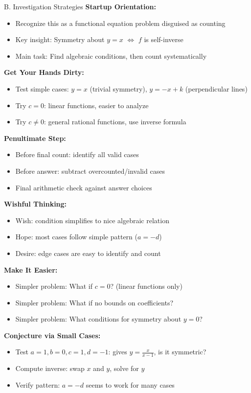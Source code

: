 \documentclass[12pt]{article}
\begin{document}
\begin{strategybox}{B. Investigation Strategies}
\textbf{Startup Orientation:}
\begin{itemize}
    \item Recognize this as a functional equation problem disguised as counting
    \item Key insight: Symmetry about $y=x$ $\Leftrightarrow$ $f$ is self-inverse
    \item Main task: Find algebraic conditions, then count systematically
\end{itemize}

\textbf{Get Your Hands Dirty:}
\begin{itemize}
    \item Test simple cases: $y=x$ (trivial symmetry), $y=-x+k$ (perpendicular lines)
    \item Try $c=0$: linear functions, easier to analyze
    \item Try $c \neq 0$: general rational functions, use inverse formula
\end{itemize}

\textbf{Penultimate Step:}
\begin{itemize}
    \item Before final count: identify all valid cases
    \item Before answer: subtract overcounted/invalid cases
    \item Final arithmetic check against answer choices
\end{itemize}

\textbf{Wishful Thinking:}
\begin{itemize}
    \item Wish: condition simplifies to nice algebraic relation
    \item Hope: most cases follow simple pattern ($a=-d$)
    \item Desire: edge cases are easy to identify and count
\end{itemize}

\textbf{Make It Easier:}
\begin{itemize}
    \item Simpler problem: What if $c=0$? (linear functions only)
    \item Simpler problem: What if no bounds on coefficients?
    \item Simpler problem: What conditions for symmetry about $y=0$?
\end{itemize}

\textbf{Conjecture via Small Cases:}
\begin{itemize}
    \item Test $a=1, b=0, c=1, d=-1$: gives $y=\frac{x}{x-1}$, is it symmetric?
    \item Compute inverse: swap $x$ and $y$, solve for $y$
    \item Verify pattern: $a=-d$ seems to work for many cases
\end{itemize}


\end{strategybox}
\end{document}
